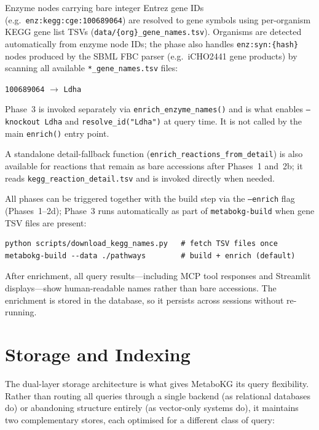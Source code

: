 \documentclass[10pt]{article}
\begin{document}
\begin{description}[leftmargin=*,itemsep=3pt]
  \item[Phase~3 --- organism gene symbols (called separately).]
    Enzyme nodes carrying bare integer Entrez gene IDs
    (e.g.\ \texttt{enz:kegg:cge:100689064}) are resolved to gene symbols
    using per-organism KEGG gene list TSVs
    (\texttt{data/\{org\}\_gene\_names.tsv}).  Organisms are detected
    automatically from enzyme node IDs; the phase also handles
    \texttt{enz:syn:\{hash\}} nodes produced by the SBML FBC parser
    (e.g.\ iCHO2441 gene products) by scanning all available
    \texttt{*\_gene\_names.tsv} files:
    \begin{center}
      \texttt{100689064} $\to$ \texttt{Ldha}
    \end{center}
    Phase~3 is invoked separately via \texttt{enrich\_enzyme\_names()} and
    is what enables \texttt{--knockout Ldha} and
    \texttt{resolve\_id("Ldha")} at query time.
    It is not called by the main \texttt{enrich()} entry point.
\end{description}

A standalone detail-fallback function (\texttt{enrich\_reactions\_from\_detail})
is also available for reactions that remain as bare accessions after
Phases~1 and~2b; it reads \texttt{kegg\_reaction\_detail.tsv} and is
invoked directly when needed.

All phases can be triggered together with the build step via the
\texttt{--enrich} flag (Phases~1--2d); Phase~3 runs automatically as part
of \texttt{metabokg-build} when gene TSV files are present:

\begin{lstlisting}[style=bash]
python scripts/download_kegg_names.py   # fetch TSV files once
metabokg-build --data ./pathways        # build + enrich (default)
\end{lstlisting}

After enrichment, all query results---including MCP tool responses and
Streamlit displays---show human-readable names rather than bare accessions.
The enrichment is stored in the database, so it persists across sessions
without re-running.

\section{Storage and Indexing}
\label{sec:storage}

The dual-layer storage architecture is what gives MetaboKG its query
flexibility. Rather than routing all queries through a single backend (as
relational databases do) or abandoning structure entirely (as vector-only
systems do), it maintains two complementary stores, each optimised for a
different class of query:
\end{document}
